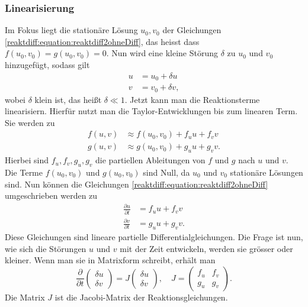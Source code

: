 \subsubsection{Linearisierung}
Im Fokus liegt die stationäre Lösung \(u_0, v_0\) der Gleichungen \eqref{reaktdiff:equation:reaktdiff2ohneDiff}, das heisst dass \(f(u_0,v_0) = g(u_0,v_0) = 0\).
Nun wird eine kleine Störung $\delta$ zu $u_0$ und $v_0$ hinzugefügt, sodass gilt
\begin{align*}
    u &= u_0 + \delta u\\
    v &= v_0 + \delta v,
\end{align*}
wobei $\delta$ klein ist, das heißt $\delta \ll 1$.
Jetzt kann man die Reaktionsterme linearisiern.
Hierfür nutzt man die Taylor-Entwicklungen bis zum linearen Term.
Sie werden zu
\begin{align*}
    f(u,v) &\approx f(u_0,v_0) + f_u  u + f_v v\\
    g(u,v) &\approx g(u_0,v_0) + g_u  u + g_v v.
\end{align*}
Hierbei sind \(f_u, f_v, g_u, g_v\) die partiellen Ableitungen von \(f\) und \(g\) nach \(u\) und \(v\).
Die Terme \(f(u_0,v_0)\) und \(g(u_0,v_0)\) sind Null, da \(u_0\) und \(v_0\) stationäre Lösungen sind.
Nun können die Gleichungen \eqref{reaktdiff:equation:reaktdiff2ohneDiff} umgeschrieben werden zu
\begin{align}
    \label{reaktdiff:equation:reaktdiff2ohneDifflinearisiert1}
    \frac{\partial u}{\partial t} &= f_u u + f_v v\\
    \label{reaktdiff:equation:reaktdiff2ohneDifflinearisiert2}
    \frac{\partial v}{\partial t} &= g_u u + g_v  v.
\end{align}
Diese Gleichungen sind lineare partielle Differentialgleichungen.
Die Frage ist nun, wie sich die Störungen \(u\) und \(v\) mit der Zeit entwickeln, werden sie grösser oder kleiner.
Wenn man sie in Matrixform schreibt, erhält man
\begin{equation*}
    \label{reaktdiff:equation:reaktdiff2ohneDiffmatrix}
    \frac{\partial}{\partial t} \begin{pmatrix}
        \delta u\\
        \delta v
    \end{pmatrix} = 
    J 
    \begin{pmatrix}
        \delta u\\
        \delta v
    \end{pmatrix}
    , \quad
    J =
    \begin{pmatrix}
        f_u & f_v\\
        g_u & g_v
    \end{pmatrix}.
\end{equation*}
Die Matrix \(J\) ist die Jacobi-Matrix der Reaktionsgleichungen.

